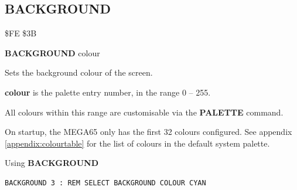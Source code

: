 \subsection{BACKGROUND}
\begin{description}[leftmargin=2cm,style=nextline]
\item [Token:]   \$FE \$3B

\item [Format:]  {\bf BACKGROUND} colour

\item [Usage:]   Sets the background colour of the screen.

                 {\bf colour} is the palette entry number, in the range 0 -- 255.

                 All colours within this range are customisable via the {\bf PALETTE} command.
                 
                 On startup, the MEGA65 only has the first 32 colours configured. See appendix \vref{appendix:colourtable} for the list of colours in the default system palette.

\item [Example:] Using {\bf BACKGROUND}

\begin{tcolorbox}[colback=black,coltext=white]
\verbatimfont{\codefont}
\begin{verbatim}
BACKGROUND 3 : REM SELECT BACKGROUND COLOUR CYAN
\end{verbatim}
\end{tcolorbox}
\end{description}


\newpage
